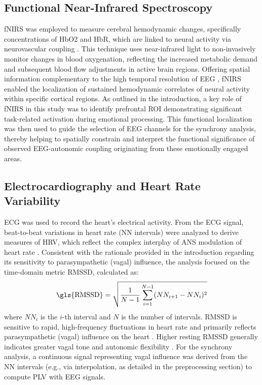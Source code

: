 \subsection{Functional Near-Infrared Spectroscopy}
\gls{fNIRS} was employed to measure cerebral hemodynamic changes, specifically concentrations of \gls{HbO2} and \gls{HbR}, which are linked to neural activity via neurovascular coupling \parencite{scholkmannReviewContinuousWave2014, jobsisNoninvasiveInfraredMonitoring1977, obrigVisibleImagingHuman2003}. This technique uses near-infrared light to non-invasively monitor changes in blood oxygenation, reflecting the increased metabolic demand and subsequent blood flow adjustments in active brain regions. Offering spatial information complementary to the high temporal resolution of \gls{EEG} \parencite{pintiCurrentStatusIssues2019}, \gls{fNIRS} enabled the localization of sustained hemodynamic correlates of neural activity within specific cortical regions. As outlined in the introduction, a key role of \gls{fNIRS} in this study was to identify prefrontal \gls{ROI} demonstrating significant task-related activation during emotional processing. This functional localization was then used to guide the selection of \gls{EEG} channels for the synchrony analysis, thereby helping to spatially constrain and interpret the functional significance of observed \gls{EEG}-autonomic coupling originating from these emotionally engaged areas.

\subsection{Electrocardiography and Heart Rate Variability}
\gls{ECG} was used to record the heart's electrical activity. From the \gls{ECG} signal, beat-to-beat variations in heart rate (\gls{NN intervals}) were analyzed to derive measures of \gls{HRV}, which reflect the complex interplay of \gls{ANS} modulation of heart rate \parencite{malikHeartRateVariability1996, berntsonHeartRateVariability1997}. Consistent with the rationale provided in the introduction regarding its sensitivity to parasympathetic (vagal) influence, the analysis focused on the time-domain metric \gls{RMSSD}, calculated as:
\begin{equation}
    \text{\gls{RMSSD}} = \sqrt{\frac{1}{N-1} \sum_{i=1}^{N-1} (NN_{i+1} - NN_i)^2}
    \label{eq:rmssd} %
\end{equation}
where $NN_i$ is the $i$-th interval and $N$ is the number of intervals. \gls{RMSSD} is sensitive to rapid, high-frequency fluctuations in heart rate and primarily reflects parasympathetic (vagal) influence on the heart \parencite{malikHeartRateVariability1996, shafferOverviewHeartRate2017}. Higher resting \gls{RMSSD} generally indicates greater vagal tone and autonomic flexibility \parencite{thayerRelationshipAutonomicImbalance2010}. For the synchrony analysis, a continuous signal representing vagal influence was derived from the \gls{NN intervals} (e.g., via interpolation, as detailed in the preprocessing section) to compute \gls{PLV} with \gls{EEG} signals.

